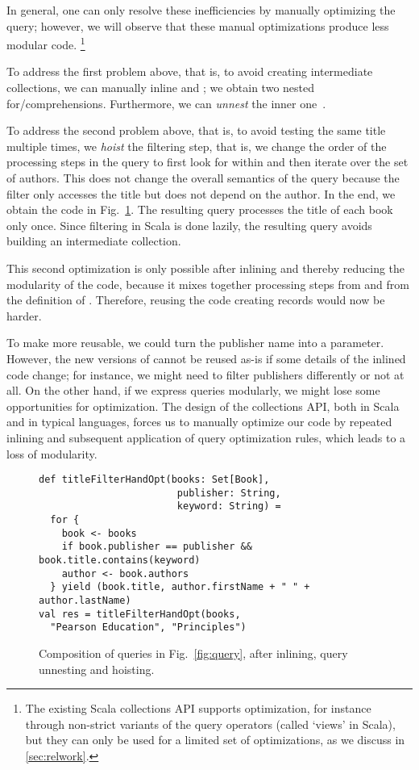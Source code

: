 In general, one can only resolve these inefficiencies by manually optimizing the query; however, we will observe that these manual optimizations produce less modular code.%
\footnote{%
The existing Scala collections API supports optimization, for instance through non-strict variants of the query operators (called `views' in Scala), but they can only
be used for a limited set of optimizations, as we discuss in \cref{sec:relwork}.}

To address the first problem above, that is, to avoid creating intermediate collections, we can manually inline  and ; we obtain two nested for\-/comprehensions.
Furthermore, we can \emph{unnest} the inner one~\citep{Fegaras00}.

To address the second problem above, that is, to avoid testing the same title multiple times, we \emph{hoist} the filtering step, that is, we change the order of the processing steps in the query to first look for  within  and then iterate over the set of authors. This does not change the overall semantics of the query because the filter only accesses the title but does not depend on the author. In the end, we obtain the code in Fig.~\ref{fig:titleFilterho2}. The resulting query processes the title of each book only once. Since filtering in Scala is done lazily, the resulting query avoids building an intermediate collection.

This second optimization is only possible after inlining and thereby reducing the modularity of the code, because it mixes together processing steps from  and from the definition of . Therefore, reusing the code creating records would now be harder.

To make  more reusable, we could turn the publisher name into a parameter.
However, the new versions of  cannot be reused as-is if some details of the inlined code change; for instance, we might need to filter publishers differently or not at all. On the other hand, if we express queries modularly, we might lose some opportunities for optimization. The design of the collections API, both in Scala and in typical languages, forces us to manually optimize our code by repeated inlining and subsequent application of query optimization rules, which leads to a loss of modularity.

\begin{figure}
\centering
\begin{lstlisting}
def titleFilterHandOpt(books: Set[Book],
                        publisher: String,
                        keyword: String) =
  for {
    book <- books
    if book.publisher == publisher && book.title.contains(keyword)
    author <- book.authors
  } yield (book.title, author.firstName + " " + author.lastName)
val res = titleFilterHandOpt(books,
  "Pearson Education", "Principles")
\end{lstlisting}
\caption{Composition of queries in Fig.~\ref{fig:query}, after inlining, query unnesting and hoisting.}
\label{fig:titleFilterho2}
\end{figure}


